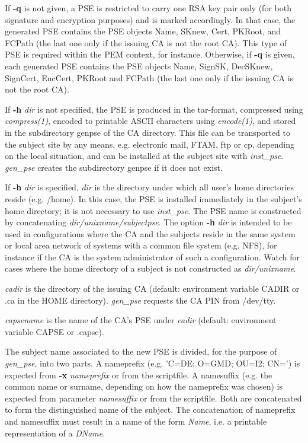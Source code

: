 If {\bf -q} is not given, a PSE is restricted to carry one RSA key pair only (for both signature and encryption 
purposes)
and is marked accordingly. In that case, the generated PSE contains the PSE objects Name, SKnew, Cert, 
PKRoot, and FCPath
(the last one only if the issuing CA is not the root CA). This type of PSE is required within the PEM context, 
for instance.
Otherwise, if {\bf -q} is given, each generated PSE contains the PSE objects Name, SignSK, DecSKnew, 
SignCert,
EncCert, PKRoot and FCPath (the last one only if the issuing CA is not the root CA).

If {\bf -h} {\em dir} is not specified, the PSE is produced in the tar-format, compressed
using {\em compress(1)}, encoded to printable ASCII characters using {\em encode(1)}, and
stored in the subdirectory genpse of the CA directory. This file can be transported
to the subject site by any means, e.g. electronic mail, FTAM, ftp or cp, depending on
the local situation, and can be installed at the subject site with {\em inst\_pse}. 
{\em gen\_pse} creates the subdirectory genpse if it does not exist.

If {\bf -h} {\em dir} is specified, {\em dir} is the directory under which all user's
home directories reside (e.g. /home). In this case, the PSE is installed immediately
in the subject's home directory; it is not necessary to use {\em inst\_pse}.
The PSE name is constructed by concatenating {\em dir/unixname/subjectpse}. The
option {\bf -h} {\em dir} is intended to be used in configurations where the CA and
the subjects reside in the same system or local area network of systems with a common
file system (e.g. NFS), for instance if the CA is the system administrator of such
a configuration. Watch for cases where the home directory of a subject is not constructed
as {\em dir/unixname}.

{\em cadir} is the directory of the issuing CA (default: environment variable CADIR or .ca in the HOME
directory).
{\em gen\_pse} requests the CA PIN from /dev/tty.

{\em capsename} is the name of the CA's PSE under {\em cadir} (default: environment variable CAPSE or .capse).

The subject name associated to the new PSE is divided, for the purpose of {\em gen\_pse}, 
into two parts. A nameprefix (e.g. 'C=DE; O=GMD; OU=I2; CN=') is expected from
{\bf -x} {\em nameprefix} or from the scriptfile. A namesuffix (e.g. the common name
or surname, depending on how the nameprefix was chosen) is expected from parameter
{\em namesuffix} or from the scriptfile. Both are concatenated to form the distinguished
name of the subject. The concatenation of nameprefix and namesuffix must result in a name
of the form {\em Name}, i.e. a printable representation of a {\em DName}.

